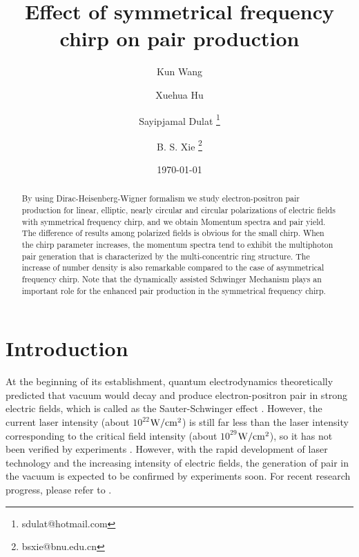 \documentclass[aps,preprint,superscriptaddress]{revtex4}
\begin{document}
\title{Effect of symmetrical frequency chirp on pair production}
\author{Kun Wang}
\author{Xuehua Hu}
\author{Sayipjamal Dulat \footnote{sdulat@hotmail.com}}
\author{B. S. Xie \footnote{bsxie@bnu.edu.cn}}
\date{\today}
\begin{abstract}
By using Dirac-Heisenberg-Wigner formalism we study electron-positron pair production for linear, elliptic, nearly circular and circular polarizations of electric fields with symmetrical frequency chirp, and we obtain Momentum spectra and pair yield.
The difference of results among polarized fields is obvious for the small chirp.
When the chirp parameter increases, the momentum spectra tend to exhibit the multiphoton pair generation that is characterized by the multi-concentric ring structure.
The increase of number density is also remarkable compared to the case of asymmetrical frequency chirp. Note that the dynamically assisted Schwinger Mechanism plays an important role for the enhanced pair production in the symmetrical frequency chirp.
\end{abstract}
\maketitle

\section{Introduction}

At the beginning of its establishment, quantum electrodynamics theoretically predicted that vacuum would decay and produce electron-positron pair in strong electric fields, which is called as the Sauter-Schwinger effect \cite{Sauter:1931zz,Heisenberg:1935qt,Schwinger:1951nm}. However, the current laser intensity (about $10^{22}$$\rm{W/cm^2}$) is still far less than the laser intensity corresponding to the critical field intensity (about $10^{29}$$\rm{W/cm^2}$), so it has not been verified by experiments \cite{Piazza:2012nb}. However, with the rapid development of laser technology and the increasing intensity of electric fields, the generation of pair in the vacuum is expected to be confirmed by experiments soon. For recent research progress, please refer to \cite{Xie:2017MR,Gelis:2015kya}.
\end{document}
